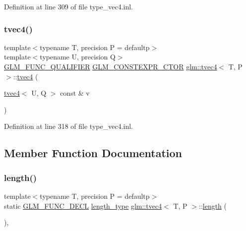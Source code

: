 Definition at line 309 of file type\+\_\+vec4.\+inl.

\mbox{\label{structglm_1_1tvec4_a5fe1b0462052b13c3f0311c273d656e5}} 
\subsubsection{\texorpdfstring{tvec4()}{tvec4()}\hspace{0.1cm}{\footnotesize\ttfamily [35/35]}}
{\footnotesize\ttfamily template$<$typename T, precision P = defaultp$>$ \\
template$<$typename U, precision Q$>$ \\
\mbox{\hyperlink{setup_8hpp_a33fdea6f91c5f834105f7415e2a64407}{G\+L\+M\+\_\+\+F\+U\+N\+C\+\_\+\+Q\+U\+A\+L\+I\+F\+I\+ER}} \mbox{\hyperlink{setup_8hpp_ad34178a09666081abdb573c14d1f4a5a}{G\+L\+M\+\_\+\+C\+O\+N\+S\+T\+E\+X\+P\+R\+\_\+\+C\+T\+OR}} \mbox{\hyperlink{structglm_1_1tvec4}{glm\+::tvec4}}$<$ T, P $>$\+::\mbox{\hyperlink{structglm_1_1tvec4}{tvec4}} (\begin{DoxyParamCaption}\item[{\mbox{\hyperlink{structglm_1_1tvec4}{tvec4}}$<$ U, Q $>$ const \&}]{v }\end{DoxyParamCaption})}



Definition at line 318 of file type\+\_\+vec4.\+inl.



\subsection{Member Function Documentation}
\mbox{\label{structglm_1_1tvec4_af5cc061d6e7bb66de7d0f3647728c9ff}} 
\subsubsection{\texorpdfstring{length()}{length()}}
{\footnotesize\ttfamily template$<$typename T, precision P = defaultp$>$ \\
static \mbox{\hyperlink{setup_8hpp_ab2d052de21a70539923e9bcbf6e83a51}{G\+L\+M\+\_\+\+F\+U\+N\+C\+\_\+\+D\+E\+CL}} \mbox{\hyperlink{structglm_1_1tvec4_a4e2b34a427cac7e72b6f73173c206feb}{length\+\_\+type}} \mbox{\hyperlink{structglm_1_1tvec4}{glm\+::tvec4}}$<$ T, P $>$\+::\mbox{\hyperlink{glad_8h_a1499969c13207ed8ab6f796685d4933f}{length}} (\begin{DoxyParamCaption}{ }\end{DoxyParamCaption})\hspace{0.3cm}{\ttfamily [inline]}, {\ttfamily [static]}}




